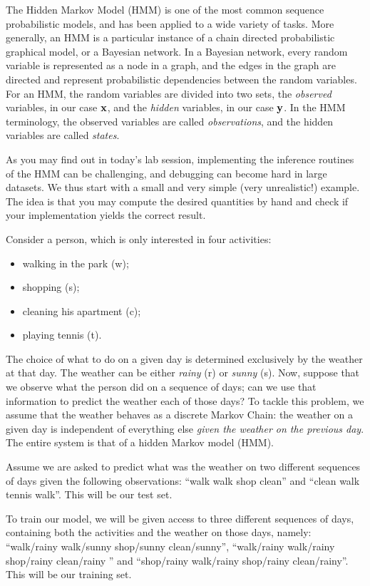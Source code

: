 
The Hidden Markov Model (HMM) is one of the most common sequence
probabilistic models, and has been applied to a wide variety of
tasks. More generally, an HMM is a particular instance of  a chain
directed probabilistic graphical model, or a Bayesian network.  In a
Bayesian network, every random variable is represented as a node in a
graph, and the edges in the graph are directed and represent
probabilistic dependencies between the random variables. For an HMM, the random variables are divided into two sets, the 
\emph{observed} variables, in our case 
$\mathbf{x}$, and the \emph{hidden} variables, in our case $\mathbf{y}$. In the HMM
terminology, the observed variables are called \emph{observations}, and the
hidden variables are called \emph{states}. 

As you may find out in today's lab session, 
implementing the inference routines of the HMM can be challenging, 
and debugging can become hard in large
datasets. We thus start with a small and very
simple (very unrealistic!) example. The idea is that you may compute the desired
quantities by hand and check if your implementation yields the correct result. 

\begin{example}

Consider a person, which is only interested in four activities: 
\begin{itemize}
\item walking in
the park (w);
\item shopping (s);
\item cleaning his apartment (c);
\item playing tennis (t).
\end{itemize}
The choice of what to do on a given day is determined exclusively by the weather at that day. The
weather can be either \emph{rainy} (r) or \emph{sunny} (s). 
Now, suppose that we observe what the person did on a sequence of days; 
can we use that information to predict the weather each of those days? 
To tackle this problem, we assume 
that the weather behaves as a discrete Markov Chain: the weather on a
given day is independent of everything else \emph{given 
the weather on the previous day}. The entire system is that of a hidden Markov model (HMM).

Assume we are asked to predict what was the weather on two different
sequences of days given the following observations: ``walk walk shop
clean''  and ``clean walk tennis walk''. This will be our test set. 


To train our model, we will be given access to three different sequences of
days, containing both the activities and the weather on those days, namely: 
``walk/rainy walk/sunny shop/sunny
clean/sunny'', ``walk/rainy walk/rainy shop/rainy clean/rainy '' and ``shop/rainy walk/rainy shop/rainy clean/rainy''. This
will be our training set.
 \end{example}

